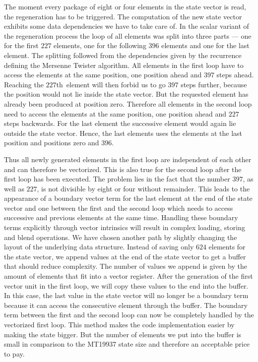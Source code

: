 \documentclass{stdlocal}
\begin{document}
    The moment every package of eight or four elements in the state vector is read, the regeneration has to be triggered.
    The computation of the new state vector exhibits some data dependencies we have to take care of.
    In the scalar variant of the regeneration process the loop of all elements was split into three parts --- one for the first $227$ elements, one for the following $396$ elements and one for the last element.
    The splitting followed from the dependencies given by the recurrence defining the Mersenne Twister algorithm.
    All elements in the first loop have to access the elements at the same position, one position ahead and $397$ steps ahead.
    Reaching the $227$th~element will then forbid us to go $397$ steps further, because the position would not lie inside the state vector.
    But the requested element has already been produced at position zero.
    Therefore all elements in the second loop need to access the elements at the same position, one position ahead and $227$ steps backwards.
    For the last element the successive element would again lie outside the state vector.
    Hence, the last elements uses the elements at the last position and positions zero and $396$.

    Thus all newly generated elements in the first loop are independent of each other and can therefore be vectorized.
    This is also true for the second loop after the first loop has been executed.
    The problem lies in the fact that the number $397$, as well as $227$, is not divisible by eight or four without remainder.
    This leads to the appearance of a boundary vector term for the last element at the end of the state vector and one between the first and the second loop which needs to access successive and previous elements at the same time.
    Handling these boundary terms explicitly through vector intrinsics will result in complex loading, storing and blend operations.
    We have chosen another path by slightly changing the layout of the underlying data structure.
    Instead of saving only $624$ elements for the state vector, we append values at the end of the state vector to get a buffer that should reduce complexity.
    The number of values we append is given by the amount of elements that fit into a vector register.
    After the generation of the first vector unit in the first loop, we will copy these values to the end into the buffer.
    In this case, the last value in the state vector will no longer be a boundary term because it can access the consecutive element through the buffer.
    The boundary term between the first and the second loop can now be completely handled by the vectorized first loop.
    This method makes the code implementation easier by making the state bigger.
    But the number of elements we put into the buffer is small in comparison to the MT19937 state size and therefore an acceptable price to pay.
\end{document}
